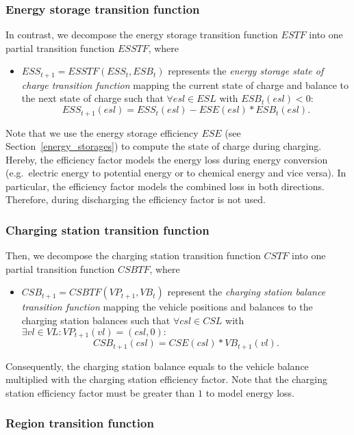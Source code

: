\subsubsection{Energy storage transition function}
\label{transitions_storages}

In contrast, we decompose the energy storage transition function $ESTF$ into one partial transition function $ESSTF$, where
\begin{itemize}
	\item $ESS_{t+1} = ESSTF(ESS_t, ESB_t)$ represents the \textit{energy storage state of charge transition function} mapping the current state of charge and balance to the next state of charge such that $\forall esl \in ESL$ with $ESB_t(esl) < 0:$
	\[
		ESS_{t+1}(esl) = ESS_t(esl) - ESE(esl) * ESB_t(esl) \textrm{.}
	\]
\end{itemize}
Note that we use the energy storage efficiency $ESE$ (see Section~\ref{energy_storages}) to compute the state of charge during charging. Hereby, the efficiency factor models the energy loss during energy conversion (e.g.\ electric energy to potential energy or to chemical energy and vice versa). In particular, the efficiency factor models the combined loss in both directions. Therefore, during discharging the efficiency factor is not used.

\subsubsection{Charging station transition function}
\label{transitions_stations}

Then, we decompose the charging station transition function $CSTF$ into one partial transition function $CSBTF$, where
\begin{itemize}
	\item $CSB_{t+1} = CSBTF(VP_{t+1}, VB_t)$ represent the \textit{charging station balance transition function} mapping the vehicle positions and balances to the charging station balances such that $\forall csl \in CSL$ with $\exists vl \in VL: VP_{t+1}(vl) = (csl, 0):$
	\[
		CSB_{t+1}(csl) = CSE(csl) * VB_{t+1}(vl) \textrm{.}
	\]
\end{itemize}
Consequently, the charging station balance equals to the vehicle balance multiplied with the charging station efficiency factor. Note that the charging station efficiency factor must be greater than $1$ to model energy loss.

\subsubsection{Region transition function}
\label{transitions_regions}

